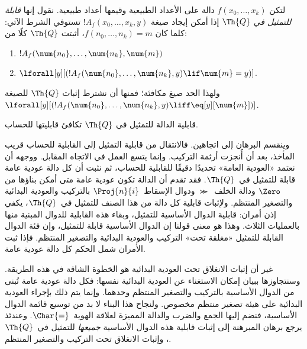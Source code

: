\documentclass[../../../include/open-logic-section]{subfiles}
\begin{document}
\begin{defn}
  لتكن $f(x_0,\ldots,x_k)$ دالة على الأعداد الطبيعية وقيمها أعداد طبيعية.
  نقول إنها {\em قابلة للتمثيل في $\Th{Q}$} إذا أمكن إيجاد صيغة
  $!A_f(x_0,\dots,x_k,y)$ تستوفي الشرط الآتي: كلما كان $f(n_0,\dots,n_k)=m$،
  أثبتت $\Th{Q}$ كلًا من:
\begin{enumerate}
\item{} $!A_f(\num{n_0}, \dots, \num{n_k}, \num{m})$
\item{} $\lforall[y][(!A_f(\num{n_0}, \dots,
\num{n_k}, y) \lif \num{m} = y)]$.
\end{enumerate}
\end{defn}

ولهذا الحد صيغ مكافئة؛ فمنها أن نشترط إثبات
$\Th{Q}$ للصيغة
$\lforall[y][(!A_f(\num{n_0},\dots,\num{n_k},y)\liff\eq[y][\num{m}])]$.

\begin{thm}
قابلية الدالة للتمثيل في $\Th{Q}$ تكافئ قابليتها للحساب.
\end{thm}

وينقسم البرهان إلى اتجاهين. فالانتقال من قابلية التمثيل إلى القابلية
للحساب قريب المأخذ، بعد أن أُنجزت أرثمة التركيب. وإنما يتسع العمل في
الاتجاه المقابل. ووجهه أن نعتمد «العودية العامة» تحديدًا دقيقًا
للقابلية للحساب، ثم نثبت أن كل دالة عودية عامة قابلة للتمثيل في~$\Th{Q}$.
فقد تقدم أن الدالة تكون عودية عامة متى أمكن بناؤها من $\Zero$ ودالة
الخلف~$\Succ$ ودوال الإسقاط~$\Proj{n}{i}$ بالتركيب والعودية البدائية
والتصغير المنتظم. ولإثبات قابلية كل دالة من هذا الصنف للتمثيل
في~$\Th{Q}$، يكفي إذن أمران: قابلية الدوال الأساسية للتمثيل، وبقاء هذه
القابلية للدوال المبنية منها بالعمليات الثلاث. وهذا هو معنى قولنا إن
الدوال الأساسية قابلة للتمثيل، وإن فئة الدوال القابلة للتمثيل «مغلقة تحت»
التركيب والعودية البدائية والتصغير المنتظم. فإذا ثبت الأمران شمل الحكم
كل دالة عودية عامة.

غير أن إثبات الانغلاق تحت العودية البدائية هو الخطوة الشاقة في هذه
الطريقة. وسنتجاوزها ببيان إمكان الاستغناء عن العودية البدائية نفسها:
فكل دالة عودية عامة تُبنى من الدوال الأساسية بالتركيب والتصغير المنتظم
وحدهما. وإنما يتم ذلك بإجراء العودية البدائية على هيئة تصغير منتظم
مخصوص. ولنجاح هذا البناء لا بد من توسيع قائمة الدوال الأساسية، فنضم
إليها الجمع والضرب والدالة المميزة لعلاقة الهوية~$\Char{=}$.
وعندئذ يرجع برهان المبرهنة إلى إثبات قابلية هذه الدوال الأساسية
\emph{جميعها} للتمثيل في~$\Th{Q}$، وإثبات الانغلاق تحت التركيب
والتصغير المنتظم.
\end{document}
